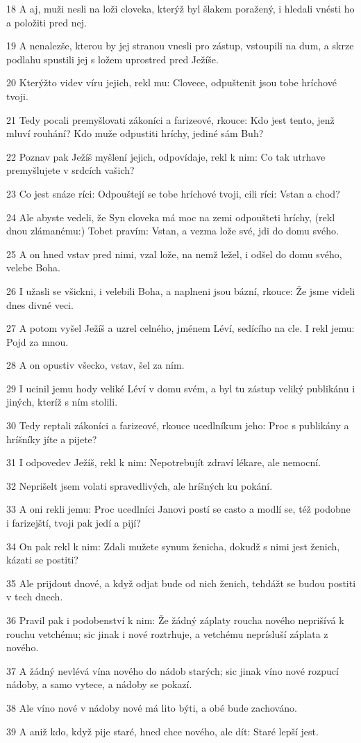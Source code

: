 \par 18 A aj, muži nesli na loži cloveka, kterýž byl šlakem poražený, i hledali vnésti ho a položiti pred nej.
\par 19 A nenalezše, kterou by jej stranou vnesli pro zástup, vstoupili na dum, a skrze podlahu spustili jej s ložem uprostred pred Ježíše.
\par 20 Kterýžto videv víru jejich, rekl mu: Clovece, odpuštenit jsou tobe hríchové tvoji.
\par 21 Tedy pocali premyšlovati zákoníci a farizeové, rkouce: Kdo jest tento, jenž mluví rouhání? Kdo muže odpustiti hríchy, jediné sám Buh?
\par 22 Poznav pak Ježíš myšlení jejich, odpovídaje, rekl k nim: Co tak utrhave premyšlujete v srdcích vašich?
\par 23 Co jest snáze ríci: Odpouštejí se tobe hríchové tvoji, cili ríci: Vstan a chod?
\par 24 Ale abyste vedeli, že Syn cloveka má moc na zemi odpoušteti hríchy, (rekl dnou zlámanému:) Tobet pravím: Vstan, a vezma lože své, jdi do domu svého.
\par 25 A on hned vstav pred nimi, vzal lože, na nemž ležel, i odšel do domu svého, velebe Boha.
\par 26 I užasli se všickni, i velebili Boha, a naplneni jsou bázní, rkouce: Že jsme videli dnes divné veci.
\par 27 A potom vyšel Ježíš a uzrel celného, jménem Léví, sedícího na cle. I rekl jemu: Pojd za mnou.
\par 28 A on opustiv všecko, vstav, šel za ním.
\par 29 I ucinil jemu hody veliké Léví v domu svém, a byl tu zástup veliký publikánu i jiných, kteríž s ním stolili.
\par 30 Tedy reptali zákoníci a farizeové, rkouce ucedlníkum jeho: Proc s publikány a hríšníky jíte a pijete?
\par 31 I odpovedev Ježíš, rekl k nim: Nepotrebujít zdraví lékare, ale nemocní.
\par 32 Neprišelt jsem volati spravedlivých, ale hríšných ku pokání.
\par 33 A oni rekli jemu: Proc ucedlníci Janovi postí se casto a modlí se, též podobne i farizejští, tvoji pak jedí a pijí?
\par 34 On pak rekl k nim: Zdali mužete synum ženicha, dokudž s nimi jest ženich, kázati se postiti?
\par 35 Ale prijdout dnové, a když odjat bude od nich ženich, tehdážt se budou postiti v tech dnech.
\par 36 Pravil pak i podobenství k nim: Že žádný záplaty roucha nového neprišívá k rouchu vetchému; sic jinak i nové roztrhuje, a vetchému neprísluší záplata z nového.
\par 37 A žádný nevlévá vína nového do nádob starých; sic jinak víno nové rozpucí nádoby, a samo vytece, a nádoby se pokazí.
\par 38 Ale víno nové v nádoby nové má lito býti, a obé bude zachováno.
\par 39 A aniž kdo, když pije staré, hned chce nového, ale dít: Staré lepší jest.

